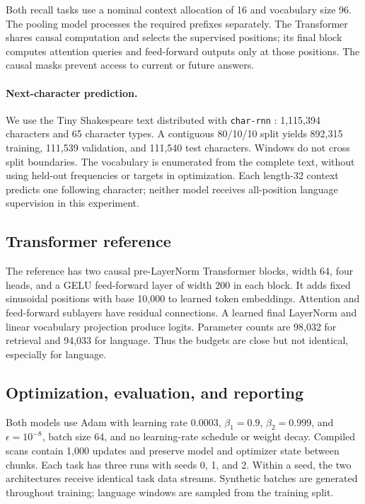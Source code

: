 \documentclass[11pt]{article}
\begin{document}
Both recall tasks use a nominal context allocation of 16 and vocabulary size 96. The pooling model processes the required prefixes separately. The Transformer shares causal computation and selects the supervised positions; its final block computes attention queries and feed-forward outputs only at those positions. The causal masks prevent access to current or future answers.

\paragraph{Next-character prediction.}
We use the Tiny Shakespeare text distributed with \texttt{char-rnn} \cite{shakespeare}: 1,115,394 characters and 65 character types. A contiguous 80/10/10 split yields 892,315 training, 111,539 validation, and 111,540 test characters. Windows do not cross split boundaries. The vocabulary is enumerated from the complete text, without using held-out frequencies or targets in optimization. Each length-32 context predicts one following character; neither model receives all-position language supervision in this experiment.

\subsection{Transformer reference}
The reference has two causal pre-LayerNorm Transformer blocks, width 64, four heads, and a GELU feed-forward layer of width 200 in each block. It adds fixed sinusoidal positions with base 10,000 to learned token embeddings. Attention and feed-forward sublayers have residual connections. A learned final LayerNorm and linear vocabulary projection produce logits. Parameter counts are 98,032 for retrieval and 94,033 for language. Thus the budgets are close but not identical, especially for language.

\subsection{Optimization, evaluation, and reporting}
Both models use Adam with learning rate 0.0003, $\beta_1=0.9$, $\beta_2=0.999$, and $\epsilon=10^{-8}$, batch size 64, and no learning-rate schedule or weight decay. Compiled scans contain 1,000 updates and preserve model and optimizer state between chunks. Each task has three runs with seeds 0, 1, and 2. Within a seed, the two architectures receive identical task data streams. Synthetic batches are generated throughout training; language windows are sampled from the training split.
\end{document}
